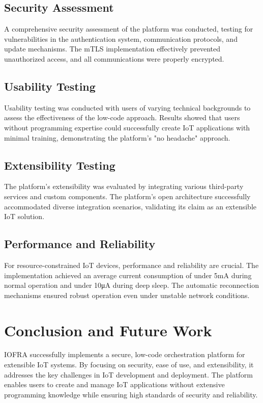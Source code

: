\documentclass[conference]{IEEEtran}
\begin{document}
\subsection{Security Assessment}
A comprehensive security assessment of the platform was conducted, testing for vulnerabilities in the authentication system, communication protocols, and update mechanisms. The mTLS implementation effectively prevented unauthorized access, and all communications were properly encrypted.

\subsection{Usability Testing}
Usability testing was conducted with users of varying technical backgrounds to assess the effectiveness of the low-code approach. Results showed that users without programming expertise could successfully create IoT applications with minimal training, demonstrating the platform's "no headache" approach.

\subsection{Extensibility Testing}
The platform's extensibility was evaluated by integrating various third-party services and custom components. The platform's open architecture successfully accommodated diverse integration scenarios, validating its claim as an extensible IoT solution.

\subsection{Performance and Reliability}
For resource-constrained IoT devices, performance and reliability are crucial. The implementation achieved an average current consumption of under 5mA during normal operation and under 10μA during deep sleep. The automatic reconnection mechanisms ensured robust operation even under unstable network conditions.

\section{Conclusion and Future Work}
IOFRA successfully implements a secure, low-code orchestration platform for extensible IoT systems. By focusing on security, ease of use, and extensibility, it addresses the key challenges in IoT development and deployment. The platform enables users to create and manage IoT applications without extensive programming knowledge while ensuring high standards of security and reliability.
\end{document}
